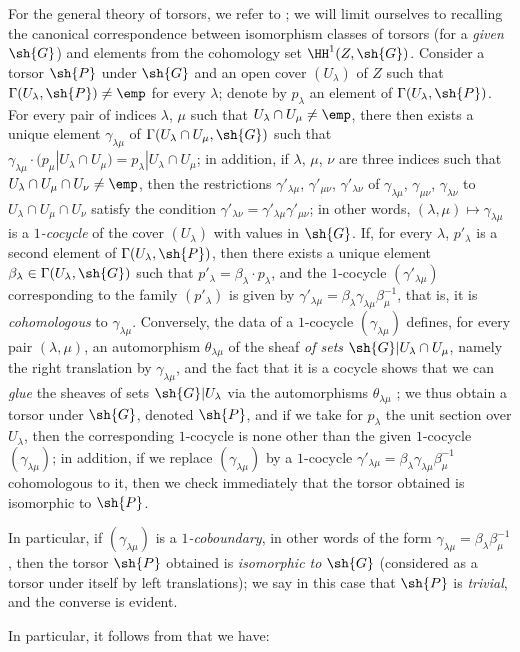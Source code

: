 \begin{env}[16.5.15]
For the general theory of torsors, we refer to \cite{IV-42};
we will limit ourselves to recalling the canonical correspondence between isomorphism classes of torsors (for a \emph{given} $\sh{G}$) and elements from the cohomology set $\HH^1(Z, \sh{G})$.
Consider a torsor $\sh{P}$ under $\sh{G}$ and an open cover $(U_\lambda)$ of $Z$ such that $\Gamma(U_\lambda, \sh{P}) \neq \emp$ for every $\lambda$;
denote by $p_\lambda$ an element of $\Gamma(U_\lambda, \sh{P})$.
For every pair of indices $\lambda$, $\mu$ such that $U_\lambda \cap U_\mu \neq \emp$, there then exists a unique element $\gamma_{\lambda\mu}$ of $\Gamma(U_\lambda \cap U_\mu, \sh{G})$ such that $\gamma_{\lambda\mu} \cdot (p_\mu|U_\lambda \cap U_\mu) = p_\lambda|U_\lambda \cap U_\mu$;
in addition, if $\lambda$, $\mu$, $\nu$ are three indices such that $U_\lambda \cap U_\mu \cap U_\nu \neq \emp$, then the restrictions $\gamma'_{\lambda\mu}$, $\gamma'_{\mu\nu}$, $\gamma'_{\lambda\nu}$ of $\gamma_{\lambda\mu}$, $\gamma_{\mu\nu}$, $\gamma_{\lambda\nu}$ to $U_\lambda \cap U_\mu \cap U_\nu$ satisfy the condition $\gamma'_{\lambda\nu} = \gamma'_{\lambda\mu} \gamma'_{\mu\nu}$;
in other words, $(\lambda, \mu) \mapsto \gamma_{\lambda\mu}$ is a \emph{$1$-cocycle} of the cover $(U_\lambda)$ with values in $\sh{G}$.
If, for every $\lambda$, $p'_\lambda$ is a second element of $\Gamma(U_\lambda, \sh{P})$, then there exists a unique element $\beta_\lambda \in \Gamma(U_\lambda, \sh{G})$ such that $p'_\lambda = \beta_\lambda \cdot p_\lambda$, and the $1$-cocycle $(\gamma'_{\lambda\mu})$ corresponding to the family $(p'_\lambda)$ is given by $\gamma'_{\lambda\mu} = \beta_\lambda \gamma_{\lambda\mu} \beta_\mu^{-1}$, that is, it is \emph{cohomologous} to $\gamma_{\lambda\mu}$.
Conversely, the data of a $1$-cocycle $(\gamma_{\lambda\mu})$ defines, for every pair $(\lambda, \mu)$, an automorphism $\theta_{\lambda\mu}$ of the sheaf \emph{of sets} $\sh{G}|U_\lambda \cap U_\mu$, namely the right translation by $\gamma_{\lambda\mu}$, and the fact that it is a cocycle shows that we can \emph{glue} the sheaves of sets $\sh{G}|U_\lambda$ via the automorphisms $\theta_{\lambda\mu}$ ;
we thus obtain a torsor under $\sh{G}$, denoted $\sh{P}$, and if we take for $p_\lambda$ the unit section over $U_\lambda$, then the corresponding $1$-cocycle is none other than the given $1$-cocycle $(\gamma_{\lambda\mu})$;
in addition, if we replace $(\gamma_{\lambda\mu})$ by a $1$-cocycle $\gamma'_{\lambda\mu} = \beta_\lambda \gamma_{\lambda\mu} \beta_\mu^{-1}$ cohomologous to it, then we check immediately that the torsor obtained is isomorphic to $\sh{P}$.

In particular, if $(\gamma_{\lambda\mu})$ is a \emph{$1$-coboundary}, in other words of the form $\gamma_{\lambda\mu} = \beta_\lambda \beta_\mu^{-1}$, then the torsor $\sh{P}$ obtained is \emph{isomorphic to $\sh{G}$} (considered as a torsor under itself by left translations);
we say in this case that $\sh{P}$ is \emph{trivial}, and the converse is evident.

In particular, it follows from  that we have:
\end{env}

